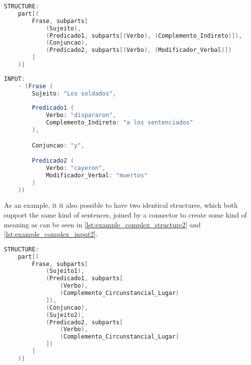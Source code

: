 \begin{center}
\begin{minipage}{15cm}
\begin{lstlisting}[language=java, basicstyle=\small, label={lst:example_complex_structure}, caption=Example of a more complex structure]
STRUCTURE:
    part[(
        Frase, subparts[
            (Sujeito),
            (Predicado1, subparts[(Verbo), (Complemento_Indireto)]),
            (Conjuncao),
            (Predicado2, subparts[(Verbo), (Modificador_Verbal)])
        ]
    )]
\end{lstlisting}
\end{minipage}
\end{center}

\begin{center}
\begin{minipage}{12cm}
\begin{lstlisting}[language=java, basicstyle=\small, label={lst:example_complex_input}, caption=Example of a more complex sentence input]
INPUT:
    - (Frase (
        Sujeito: "Los soldados",
		
        Predicado1 (
            Verbo: "dispararon",
            Complemento_Indireto: "a los sentenciados"
        ),

        Conjuncao: "y",

        Predicado2 (
            Verbo: "cayeron",
            Modificador_Verbal: "muertos"
        )
    ))
\end{lstlisting}
\end{minipage}
\end{center}

As an example, it it also possible to have two identical structures, which both support the same kind of sentences,
joined by a connector to create some kind of meaning as can be seen in \autoref{lst:example_complex_structure2} and \autoref{lst:example_complex_input2}.

\begin{center}
\begin{minipage}{12cm}
\begin{lstlisting}[language=java, basicstyle=\small, label={lst:example_complex_structure2}, caption=Example of a another more complex structure]
STRUCTURE:
    part[(
        Frase, subparts[
            (Sujeito1),
            (Predicado1, subparts[
                (Verbo),
                (Complemento_Circunstancial_Lugar)
            ]),
            (Conjuncao),
            (Sujeito2),
            (Predicado2, subparts[
                (Verbo),
                (Complemento_Circunstancial_Lugar)
            ])
        ]
    )]
\end{lstlisting}
\end{minipage}
\end{center}

